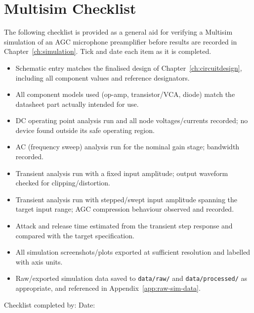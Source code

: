 \chapter{Multisim Checklist}
\label{app:multisim-checklist}

The following checklist is provided as a general aid for verifying a Multisim simulation of an AGC microphone preamplifier before results are recorded in Chapter~\ref{ch:simulation}. Tick and date each item as it is completed.

\begin{itemize}
    \item[$\square$] Schematic entry matches the finalised design of Chapter~\ref{ch:circuitdesign}, including all component values and reference designators.
    \item[$\square$] All component models used (op-amp, transistor/VCA, diode) match the datasheet part actually intended for use.
    \item[$\square$] DC operating point analysis run and all node voltages/currents recorded; no device found outside its safe operating region.
    \item[$\square$] AC (frequency sweep) analysis run for the nominal gain stage; bandwidth recorded.
    \item[$\square$] Transient analysis run with a fixed input amplitude; output waveform checked for clipping/distortion.
    \item[$\square$] Transient analysis run with stepped/swept input amplitude spanning the target input range; AGC compression behaviour observed and recorded.
    \item[$\square$] Attack and release time estimated from the transient step response and compared with the target specification.
    \item[$\square$] All simulation screenshots/plots exported at sufficient resolution and labelled with axis units.
    \item[$\square$] Raw/exported simulation data saved to \texttt{data/raw/} and \texttt{data/processed/} as appropriate, and referenced in Appendix~\ref{app:raw-sim-data}.
\end{itemize}

\vspace{0.5cm}
\noindent Checklist completed by:  \quad Date: 
